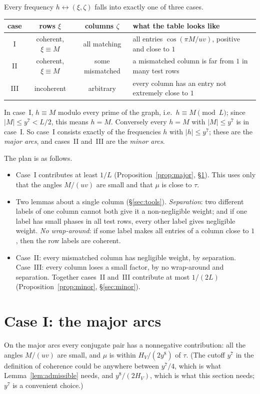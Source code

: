 \documentclass[11pt]{amsart}
\theoremstyle{definition}
\theoremstyle{remark}
\begin{document}
Every frequency $h\leftrightarrow(\xi,\zeta)$ falls into exactly one of three cases.
\begin{center}
\renewcommand{\arraystretch}{1.25}
\begin{tabular}{c|c|c|p{}}
 case & rows $\xi$ & columns $\zeta$ & what the table looks like\\\hline
 I & coherent, $\xi\equiv M$ & all matching & all entries $\cos(\pi M/uv)$, positive and close to $1$\\
 II & coherent, $\xi\equiv M$ & some mismatched & a mismatched column is far from $1$ in many test rows\\
 III & incoherent & arbitrary & every column has an entry not extremely close to $1$
\end{tabular}
\end{center}
In case~I, $h\equiv M$ modulo every prime of the graph, i.e.\ $h\equiv M\pmod L$; since $|M|\le y^7<L/2$, this means $h=M$. Conversely every $h=M$ with $|M|\le y^7$ is in case~I. So case~I consists exactly of the frequencies $h$ with $|h|\le y^7$; these are the \emph{major arcs}, and cases~II and~III are the \emph{minor arcs}.

The plan is as follows.
\begin{itemize}
\item Case~I contributes at least $1/L$ (Proposition~\ref{prop:major}, \S\ref{sec:major}). This uses only that the angles $M/(uv)$ are small and that $\mu$ is close to $\tau$.
\item Two lemmas about a single column (\S\ref{sec:tools}). \emph{Separation}: two different labels of one column cannot both give it a non-negligible weight; and if one label has small phases in all test rows, every other label gives negligible weight. \emph{No wrap-around}: if some label makes all entries of a column close to $1$, then the row labels are coherent.
\item Case~II: every mismatched column has negligible weight, by separation. Case~III: every column loses a small factor, by no wrap-around and separation. Together cases~II and~III contribute at most $1/(2L)$ (Proposition~\ref{prop:minor}, \S\ref{sec:minor}).
\end{itemize}

\section{Case I: the major arcs}\label{sec:major}

On the major arcs every conjugate pair has a nonnegative contribution: all the angles $M/(uv)$ are small, and $\mu$ is within $H_V/(2y^8)$ of $\tau$. (The cutoff $y^7$ in the definition of coherence could be anywhere between $y^7/4$, which is what Lemma~\ref{lem:admissible} needs, and $y^8/(2H_V)$, which is what this section needs; $y^7$ is a convenient choice.)
\end{document}
